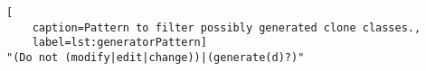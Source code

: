 
\begin{lstlisting}[
	caption=Pattern to filter possibly generated clone classes.,
	label=lst:generatorPattern]
"(Do not (modify|edit|change))|(generate(d)?)"
\end{lstlisting}